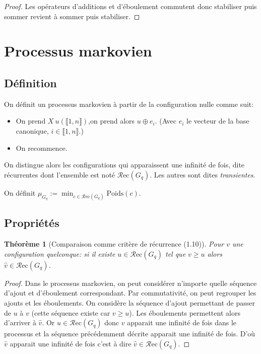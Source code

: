 \documentclass{report}
\newtheorem{theorem}{Théorème}[chapter]
\newcommand{\poids}[1]{\ensuremath{\text{Poids}(#1)}}
\newcommand{\recu}[1]{\ensuremath{\mathcal{R}\text{ec}(#1)}}
\newcommand{\poidsmin}[1]{\ensuremath{\mu_{#1}}}
\newcommand{\stab}[1]{\ensuremath{\widehat{#1}}}
\newcommand{\plus}{\ensuremath{\oplus}}
\begin{document}
\begin{proof}
Les opérateurs d'additions et d'éboulement commutent donc stabiliser  puis sommer revient à sommer puis stabiliser.
\end{proof}


\section{Processus markovien}
\subsection{Définition}
On définit un processus markovien à partir de la configuration nulle comme suit:
\begin{itemize}
\item On prend $X ~ u(\llbracket 1, n \rrbracket)$,on prend alors $u \plus{} e_i$. (Avec $e_i$ le vecteur de la base canonique, $i \in \llbracket 1, n \rrbracket$.)
\item On recommence.
\end{itemize}

On distingue alors les configurations qui apparaissent une infinité de fois, dite récurrentes dont l'ensemble est noté \recu{G_q}. Les autres sont dites \textit{transientes}.

On définit $\poidsmin{G_q} := \min_{c \in \recu{G_q}}\poids{c}$. 

\subsection{Propriétés}

\begin{theorem} [Comparaison comme critère de récurrence (1.10)]  \label{comp_rec}
Pour $v$ une configuration quelconque: si il existe $u \in \recu{G_q}$ tel que $v \geq u$ alors $\stab{v} \in \recu{G_q}$.
\end{theorem}
\begin{proof}
Dans le processus markovien, on peut considérer n'importe quelle séquence d'ajout et d'éboulement correspondant. Par commutativité, on peut regrouper les ajouts et les éboulements. On considère la séquence d'ajout permettant de passer de $u$ à $v$ (cette séquence existe car $v \geq u$). Les éboulements permettent alors d'arriver à \stab{v}. Or $u \in \recu{G_q}$ donc $v$ apparait une infinité de fois dans le processus et la séquence précédemment décrite apparait une infinité de fois. D'où \stab{v} apparait une infinité de fois c'est à dire $\stab{v} \in \recu{G_q}$. 
\end{proof}
\end{document}
